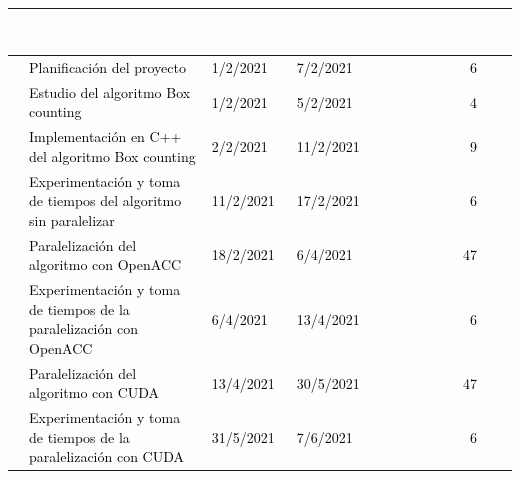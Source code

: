 \begin{table}[H]
    \centering
    \begin{adjustbox}{angle=90, max height=\textheight}
    \begin{tabular}{|clllrrl|} 
    \hline
    \rowcolor{black} \multicolumn{1}{|l}{}  & \textcolor{white}{Tareas} & \textcolor{white}{Fecha de inicio}         & \textcolor{white}{Fecha de finalización} & \textcolor{white}{Duración en días}&\\                                      
    \hline
    \rowcolor{white} \multicolumn{1}{|l}{}  & \textcolor{black}{Planificación del proyecto} & \textcolor{black}{1/2/2021}         & \textcolor{black}{7/2/2021} & \textcolor{black}{6}&\\
    \hline
    \rowcolor{white} \multicolumn{1}{|l}{}  & \textcolor{black}{Estudio del algoritmo Box counting} & \textcolor{black}{1/2/2021}         & \textcolor{black}{5/2/2021} & \textcolor{black}{4}&\\  
    \hline
    \rowcolor{white} \multicolumn{1}{|l}{}  & \textcolor{black}{Implementación en C++ del algoritmo Box counting} & \textcolor{black}{2/2/2021}         & \textcolor{black}{11/2/2021} & \textcolor{black}{9}\\
    \hline
    \rowcolor{white} \multicolumn{1}{|l}{}  & \textcolor{black}{Experimentación y toma de tiempos del algoritmo sin paralelizar} & \textcolor{black}{11/2/2021}         & \textcolor{black}{17/2/2021} &\textcolor{black}{6}&\\
    \hline
    \rowcolor{white} \multicolumn{1}{|l}{}  & \textcolor{black}{Paralelización del algoritmo con OpenACC} & \textcolor{black}{18/2/2021}         & \textcolor{black}{6/4/2021} &\textcolor{black}{47}\\
    \hline
    \rowcolor{white} \multicolumn{1}{|l}{}  & \textcolor{black}{Experimentación y toma de tiempos de la paralelización con OpenACC} & \textcolor{black}{6/4/2021}         & \textcolor{black}{13/4/2021} &\textcolor{black}{6}\\
    \hline
    \rowcolor{white} \multicolumn{1}{|l}{}  & \textcolor{black}{Paralelización del algoritmo con CUDA} & \textcolor{black}{13/4/2021}         & \textcolor{black}{30/5/2021} &\textcolor{black}{47}\\
    \hline
    \rowcolor{white} \multicolumn{1}{|l}{}  & \textcolor{black}{Experimentación y toma de tiempos de la paralelización con CUDA} & \textcolor{black}{31/5/2021}         & \textcolor{black}{7/6/2021} &\textcolor{black}{6}\\
    \hline

\end{tabular}
\end{adjustbox}
\end{table}
